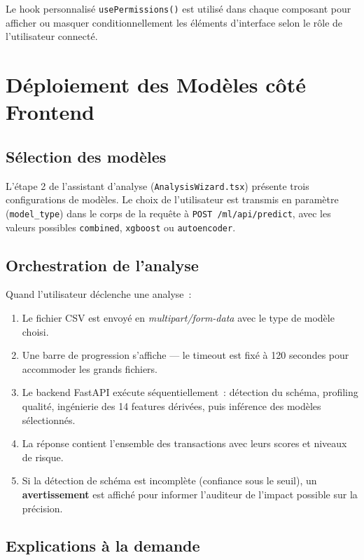 Le hook personnalisé \texttt{usePermissions()} est utilisé dans chaque composant pour afficher ou masquer conditionnellement les éléments d'interface selon le rôle de l'utilisateur connecté.

\section{Déploiement des Modèles côté Frontend}

\subsection{Sélection des modèles}

L'étape 2 de l'assistant d'analyse (\texttt{AnalysisWizard.tsx}) présente trois configurations de modèles. Le choix de l'utilisateur est transmis en paramètre (\texttt{model\_type}) dans le corps de la requête à \texttt{POST /ml/api/predict}, avec les valeurs possibles \texttt{combined}, \texttt{xgboost} ou \texttt{autoencoder}.

\subsection{Orchestration de l'analyse}

Quand l'utilisateur déclenche une analyse~:

\begin{enumerate}[leftmargin=1.5em]
  \item Le fichier CSV est envoyé en \textit{multipart/form-data} avec le type de modèle choisi.
  \item Une barre de progression s'affiche --- le timeout est fixé à 120 secondes pour accommoder les grands fichiers.
  \item Le backend FastAPI exécute séquentiellement~: détection du schéma, profiling qualité, ingénierie des 14 features dérivées, puis inférence des modèles sélectionnés.
  \item La réponse contient l'ensemble des transactions avec leurs scores et niveaux de risque.
  \item Si la détection de schéma est incomplète (confiance sous le seuil), un \textbf{avertissement} est affiché pour informer l'auditeur de l'impact possible sur la précision.
\end{enumerate}

\subsection{Explications à la demande}

